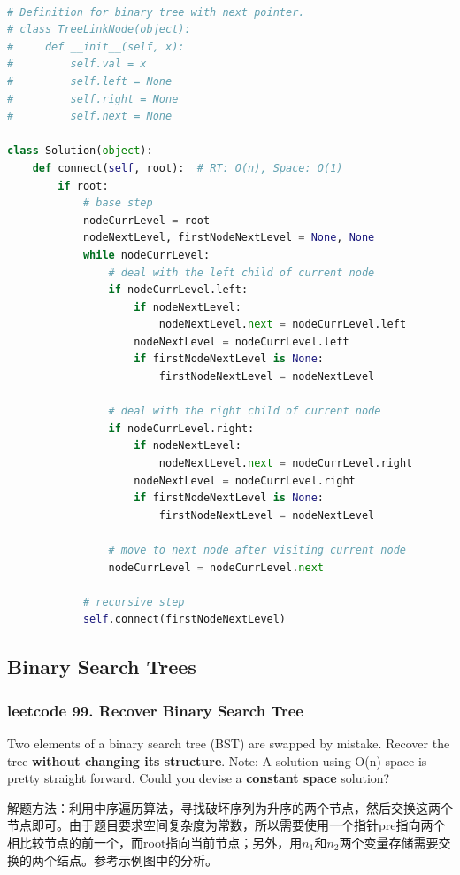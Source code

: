 \documentclass[a4paper,10pt]{article}
\begin{document}
\begin{lstlisting}[language=Python, caption=Problem117. Populating Next Right Pointers in Each Node II]

# Definition for binary tree with next pointer.
# class TreeLinkNode(object):
#     def __init__(self, x):
#         self.val = x
#         self.left = None
#         self.right = None
#         self.next = None

class Solution(object):
    def connect(self, root):  # RT: O(n), Space: O(1)
        if root:
            # base step
            nodeCurrLevel = root
            nodeNextLevel, firstNodeNextLevel = None, None
            while nodeCurrLevel:
                # deal with the left child of current node
                if nodeCurrLevel.left:
                    if nodeNextLevel:
                        nodeNextLevel.next = nodeCurrLevel.left
                    nodeNextLevel = nodeCurrLevel.left
                    if firstNodeNextLevel is None:
                        firstNodeNextLevel = nodeNextLevel

                # deal with the right child of current node
                if nodeCurrLevel.right:
                    if nodeNextLevel:
                        nodeNextLevel.next = nodeCurrLevel.right
                    nodeNextLevel = nodeCurrLevel.right
                    if firstNodeNextLevel is None:
                        firstNodeNextLevel = nodeNextLevel

                # move to next node after visiting current node
                nodeCurrLevel = nodeCurrLevel.next

            # recursive step
            self.connect(firstNodeNextLevel)
\end{lstlisting}


\subsection{Binary Search Trees}
\subsubsection{leetcode 99. Recover Binary Search Tree}
Two elements of a binary search tree (BST) are swapped by mistake. Recover the tree \textbf{without changing its structure}. Note: A solution using O(n) space is pretty straight forward. Could you devise a \textbf{constant space} solution? \\

\begin{CJK*}{UTF8}{gbsn}
\noindent 解题方法：利用中序遍历算法，寻找破坏序列为升序的两个节点，然后交换这两个节点即可。由于题目要求空间复杂度为常数，所以需要使用一个指针pre指向两个相比较节点的前一个，而root指向当前节点；另外，用$n_1$和$n_2$两个变量存储需要交换的两个结点。参考示例图中的分析。\\
\end{CJK*}
\end{document}
